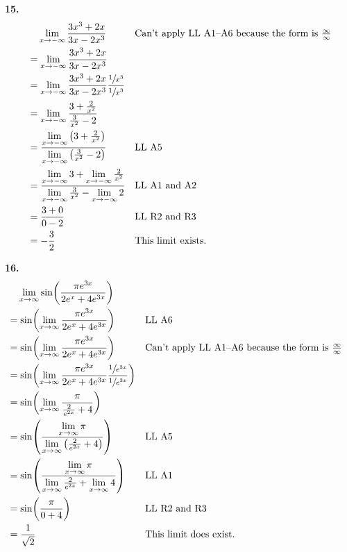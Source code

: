 \documentclass[12pt,]{book}
\theoremstyle{plain}
\theoremstyle{definition}
\numberwithin{equation}{section}
\newcommand{\fe}[2]{\mathop{{#1}{\left(#2\right)}}}
\begin{document}
\par\smallskip
\noindent\textbf{15.}\quad{}\begin{align*}
&\phantom{={}}\lim\limits_{x\to-\infty}\frac{3x^3+2x}{3x-2x^3}&&\text{Can't apply LL A1--A6 because the form is $\tfrac{\infty}{\infty}$}\\
&=\lim\limits_{x\to-\infty}\frac{3x^3+2x}{3x-2x^3}\\
&=\lim\limits_{x\to-\infty}\frac{3x^3+2x}{3x-2x^3}\frac{\sfrac{1}{x^3}}{\sfrac{1}{x^3}}\\
&=\lim\limits_{x\to-\infty}\frac{3+\frac{2}{x^2}}{\frac{3}{x^2}-2}\\
&=\frac{\lim\limits_{x\to-\infty}\left(3+\frac{2}{x^2}\right)}{\lim\limits_{x\to-\infty}\left(\frac{3}{x^2}-2\right)}&&\text{LL A5}\\
&=\frac{\lim\limits_{x\to-\infty}3+\lim\limits_{x\to-\infty}\frac{2}{x^2}}{\lim\limits_{x\to-\infty}\frac{3}{x^2}-\lim\limits_{x\to-\infty}2}&&\text{LL A1 and A2}\\
&=\frac{3+0}{0-2}&&\text{LL R2 and R3}\\
&=-\frac{3}{2}&&\text{This limit exists.}
\end{align*}%
\par\smallskip
\noindent\textbf{16.}\quad{}\begin{align*}
&\phantom{={}}\lim\limits_{x\to\infty}\fe{\sin}{\frac{\pi e^{3x}}{2e^x+4e^{3x}}}\\
&=\fe{\sin}{\lim\limits_{x\to\infty}\frac{\pi e^{3x}}{2e^x+4e^{3x}}}&&\text{LL A6}\\
&=\fe{\sin}{\lim\limits_{x\to\infty}\frac{\pi e^{3x}}{2e^x+4e^{3x}}}&&\text{Can't apply LL A1--A6 because the form is $\tfrac{\infty}{\infty}$}\\
&=\fe{\sin}{\lim\limits_{x\to\infty}\frac{\pi e^{3x}}{2e^x+4e^{3x}}\frac{\sfrac{1}{e^{3x}}}{\sfrac{1}{e^{3x}}}}\\
&=\fe{\sin}{\lim\limits_{x\to\infty}\frac{\pi}{\frac{2}{e^{2x}}+4}}\\
&=\fe{\sin}{\frac{\lim\limits_{x\to\infty}\pi}{\lim\limits_{x\to\infty}\left(\frac{2}{e^{2x}}+4\right)}}&&\text{LL A5}\\
&=\fe{\sin}{\frac{\lim\limits_{x\to\infty}\pi}{\lim\limits_{x\to\infty}\frac{2}{e^{2x}}+\lim\limits_{x\to\infty}4}}&&\text{LL A1}\\
&=\fe{\sin}{\frac{\pi}{0+4}}&&\text{LL R2 and R3}\\
&=\frac{1}{\sqrt{2}}&&\text{This limit does exist.}
\end{align*}%
\par\smallskip
\end{document}
